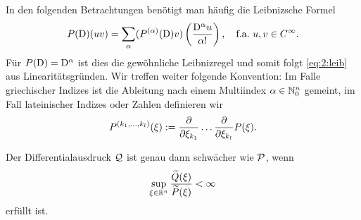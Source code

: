 In den folgenden Betrachtungen benötigt man häufig die Leibnizsche Formel
\begin{equation}\label{eq:2:leib}
P(\mathrm D)(uv)=\sum_{\alpha}(P^{(\alpha)}(\mathrm D)v)\left(\frac{\mathrm D^\alpha u}{\alpha!}\right),
\quad\text{f.a.}~u,v\in C^\infty.
\end{equation} 
Für $P(\mathrm D)=\mathrm D^\alpha$ ist dies die gewöhnliche Leibnizregel und somit folgt \eqref{eq:2:leib} aus Linearitätsgründen. Wir treffen weiter folgende Konvention:
Im Falle griechischer Indizes
ist die Ableitung nach einem Multiindex $\alpha\in\mathbb N^n_0$ gemeint,
im Fall lateinischer Indizes oder Zahlen definieren wir
\begin{equation}
P^{(k_1,\dots,k_l)}(\xi):=\frac{\partial}{\partial\xi_{k_1}}\dots\frac{\partial}{\partial\xi_{k_l}}P(\xi).
\end{equation}
%

\begin{thm}\label{thm:2:2.1}
Der Differentialausdruck $\mathcal Q$ ist genau dann schwächer wie $\mathcal P$,
wenn
\begin{equation}\label{eq:thm:2:2.1}
\sup_{\xi\in\mathbb R^n}\frac{\widetilde{Q}(\xi)}{\widetilde{P}(\xi)}<\infty
\end{equation}
erfüllt ist.
\end{thm}

